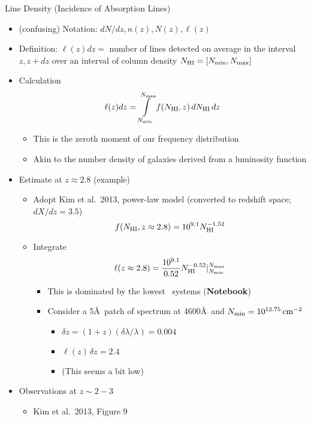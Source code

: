 \documentclass[12pt,letterpaper]{article}
\begin{document}
\begin{Aenumerate}
{\bf \item Line Density (Incidence of Absorption Lines)}
	\begin{itemize}
	\item (confusing) Notation: $dN/dz, n(z), N(z), \ell(z)$
	\item Definition:  $\ell(z) dz = $ number of lines detected
	on average in the interval $z, z+dz$ over an interval of 
	column density $N_{\rm HI} = [N_{\rm min}, N_{\rm max}]$
	\item Calculation
	\begin{equation}
	\ell(z) dz = \int\limits_{N_{\rm min}}^{N_{\rm max}} f(N_{\rm HI},z) \, dN_{\rm HI} \, dz
	\end{equation}
		\begin{itemize}
		\item This is the zeroth moment of our frequency distribution
		\item Akin to the number density of galaxies derived from a 
		luminosity function
		\end{itemize}
	\item Estimate at $z \approx 2.8$ (example)
		\begin{itemize}
		\item Adopt Kim et al.\ 2013, power-law model 
		(converted to redshift space; $dX/dz = 3.5$)
		\begin{equation}
		f(N_{\rm HI}, z \approx 2.8) = 10^{9.1} N_{\rm HI}^{-1.52}
		\end{equation}
		\item Integrate 
		\begin{equation}
		\ell(z \approx 2.8) = \frac{10^{9.1}}{0.52} N_{\rm HI}^{-0.52} 
		|_{N_{\rm min}}^{N_{\rm max}}
		\end{equation}
			\begin{itemize}
			\item This is dominated by the lowest \nhi\ systems ({\bf Notebook})
			\item Consider a 5\AA\ patch of spectrum at 4600\AA\
			and $N_{\rm min} = 10^{12.75} \, {\rm cm^{-2}}$
				\begin{itemize}
				\item $\delta z = (1+z) (\delta\lambda/\lambda) = 0.004$
				\item $\ell(z) \, \delta z = 2.4$  
				\item (This seems a bit low)
				\end{itemize}
			\end{itemize}
		\end{itemize}
	\item Observations at $z \sim 2-3$
		\begin{itemize}
		\item Kim et al.\ 2013, Figure 9


\end{itemize}
\end{itemize}
\end{Aenumerate}
\end{document}
